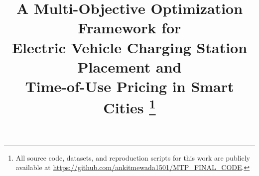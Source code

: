 \documentclass[conference]{IEEEtran}
\begin{document}
\title{A Multi-Objective Optimization Framework for\\
       Electric Vehicle Charging Station Placement and\\
       Time-of-Use Pricing in Smart Cities%
       \thanks{All source code, datasets, and reproduction
       scripts for this work are publicly available at
       \url{https://github.com/ankitmewada1501/MTP_FINAL_CODE}.}}

\author{
\and
{}
\and
{}
}

\maketitle
\end{document}
